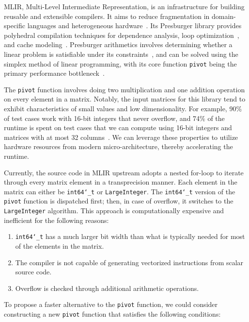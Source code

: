 \documentclass[logo,bsc,singlespacing,parskip]{infthesis}
\newcommand{\dtlong}{\texttt{int64\char`_t}}
\newcommand{\pivot}{\texttt{pivot}}
\begin{document}
MLIR, Multi-Level Intermediate Representation, is an infrastructure for building reusable and extensible compilers. It aims to reduce fragmentation in domain-specific languages and heterogeneous hardware~\cite{mlir}. Its Presburger library provides polyhedral compilation techniques for dependence analysis, loop optimization~\cite{mliraffine}, and cache modeling~\cite{CacheModel}. Presburger arithmetics involves determining whether a linear problem is satisfiable under its constraints~\cite{SMLPPA}, and can be solved using the simplex method of linear programming, with its core function \pivot{} being the primary performance bottleneck~\cite{FPL1}. 


The \texttt{pivot} function involves doing two multiplication and one addition operation on every element in a matrix. Notably, the input matrices for this library tend to exhibit characteristics of small values and low dimensionality. For example, 90\% of test cases work with 16-bit integers that never overflow, and 74\% of the runtime is spent on test cases that we can compute using 16-bit integers and matrices with at most 32 columns~\cite{FPL2}. We can leverage these properties to utilize hardware resources from modern micro-architecture, thereby accelerating the runtime.

Currently, the source code in MLIR upstream adopts a nested for-loop to iterate through every matrix element in a transprecision manner. Each element in the matrix can either be \dtlong{} or \texttt{LargeInteger}. The \dtlong{} version of the \pivot{} function is dispatched first; then, in case of overflow, it switches to the \texttt{LargeInteger} algorithm. This approach is computationally expensive and inefficient for the following reasons: 

\begin{enumerate}

\item \dtlong{} has a much larger bit width than what is typically
needed for most of the elements in the matrix.

\item The compiler is not capable of generating vectorized instructions from
scalar source code.

\item Overflow is checked through additional arithmetic
operations.

\end{enumerate}

To propose a faster alternative to the \texttt{pivot} function, we could consider constructing a new \texttt{pivot} function that satisfies the following conditions:
\end{document}
